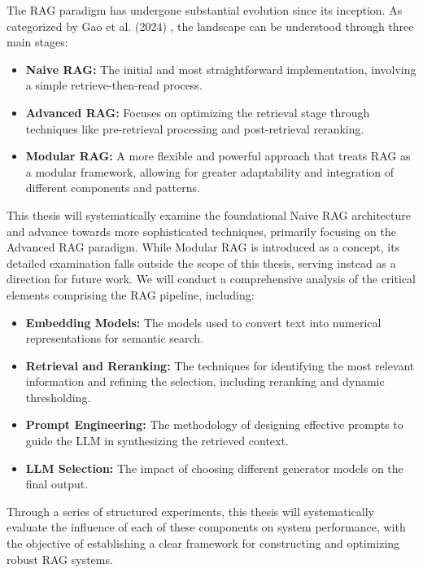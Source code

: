 The RAG paradigm has undergone substantial evolution since its inception. As categorized by Gao et al. (2024) \autocite{gao2024retrievalaugmentedgenerationlargelanguage}, the landscape can be understood through three main stages:
\begin{itemize}
    \item \textbf{Naive RAG:} The initial and most straightforward implementation, involving a simple retrieve-then-read process.
    \item \textbf{Advanced RAG:} Focuses on optimizing the retrieval stage through techniques like pre-retrieval processing and post-retrieval reranking.
    \item \textbf{Modular RAG:} A more flexible and powerful approach that treats RAG as a modular framework, allowing for greater adaptability and integration of different components and patterns.
\end{itemize}

This thesis will systematically examine the foundational Naive RAG architecture and advance towards more sophisticated techniques, primarily focusing on the Advanced RAG paradigm. While Modular RAG is introduced as a concept, its detailed examination falls outside the scope of this thesis, serving instead as a direction for future work. We will conduct a comprehensive analysis of the critical elements comprising the RAG pipeline, including:
\begin{itemize}
    \item \textbf{Embedding Models:} The models used to convert text into numerical representations for semantic search.
    \item \textbf{Retrieval and Reranking:} The techniques for identifying the most relevant information and refining the selection, including reranking and dynamic thresholding.
    \item \textbf{Prompt Engineering:} The methodology of designing effective prompts to guide the LLM in synthesizing the retrieved context.
    \item \textbf{LLM Selection:} The impact of choosing different generator models on the final output.
\end{itemize}

Through a series of structured experiments, this thesis will systematically evaluate the influence of each of these components on system performance, with the objective of establishing a clear framework for constructing and optimizing robust RAG systems.
